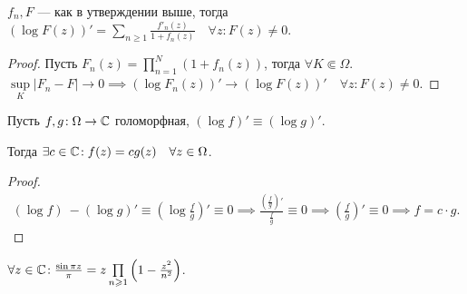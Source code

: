 \begin{consequence}
   $f_n, F$ --- как в утверждении выше, тогда $(\log F(z))' = \sum\limits_{n \ge  1} \frac{f'_n(z)}{1 + f_n(z)}\quad \forall z\!: F(z) \neq 0$.  
\end{consequence}
\begin{proof}
    Пусть $F_n(z) = \prod_{n=1}^{N} (1 + f_n(z))$, тогда $\forall K \Subset \Omega$.  $\sup\limits_{K} \left| F_n - F \right| \to 0 \implies (\log F_n(z))' \to (\log F(z))' \quad \forall z\!: F(z) \neq 0$.
\end{proof}

\begin{lemma}
    Пусть $f, g\!: \Omega \to \mathbb{C}$ голоморфная,  $\left( \log f \right)' \equiv \left( \log g \right)'$.

    Тогда $\exists c \in \mathbb{C}\!: f(z) = c g(z)\quad \forall z \in \Omega$.
\end{lemma}
\begin{proof}
    \begin{align*}
        \left( \log f \right)\ - \left( \log g \right)' \equiv \left( \log \frac{f}{g} \right) ' \equiv 0 \implies \frac{\left( \frac{f}{g} \right) '}{\frac{f}{g}}\equiv 0 \implies \left( \frac{f}{g} \right)' \equiv 0 \implies f = c \cdot g
    .\end{align*}
\end{proof}
\begin{theorem}
    $\forall z \in \mathbb{C}\!: \frac{\sin \pi z}{\pi} = z \prod\limits_{n \geqslant 1}\left( 1 - \frac{z^2}{n^2} \right)$.
\end{theorem}
